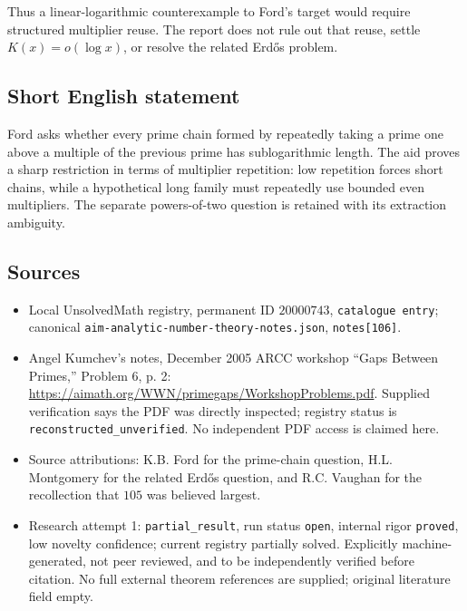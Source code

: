\documentclass[11pt]{article}
\begin{document}
Thus a linear-logarithmic counterexample to Ford's target would require structured multiplier reuse. The report does not rule out that reuse, settle $K(x)=o(\log x)$, or resolve the related Erd\H{o}s problem.
\subsection{Short English statement}
Ford asks whether every prime chain formed by repeatedly taking a prime one above a multiple of the previous prime has sublogarithmic length. The aid proves a sharp restriction in terms of multiplier repetition: low repetition forces short chains, while a hypothetical long family must repeatedly use bounded even multipliers. The separate powers-of-two question is retained with its extraction ambiguity.
\subsection{Sources}
\begin{itemize}
\item Local UnsolvedMath registry, permanent ID $20000743$, \texttt{catalogue entry}; canonical \texttt{aim-analytic-number-theory-notes.json}, \texttt{notes[106]}.
\item Angel Kumchev's notes, December 2005 ARCC workshop ``Gaps Between Primes,'' Problem 6, p. 2: \url{https://aimath.org/WWN/primegaps/WorkshopProblems.pdf}. Supplied verification says the PDF was directly inspected; registry status is \texttt{reconstructed\_unverified}. No independent PDF access is claimed here.
\item Source attributions: K.B. Ford for the prime-chain question, H.L. Montgomery for the related Erd\H{o}s question, and R.C. Vaughan for the recollection that $105$ was believed largest.
\item Research attempt 1: \texttt{partial\_result}, run status \texttt{open}, internal rigor \texttt{proved}, low novelty confidence; current registry partially solved. Explicitly machine-generated, not peer reviewed, and to be independently verified before citation. No full external theorem references are supplied; original literature field empty.
\end{itemize}
\end{document}
